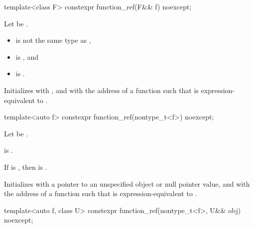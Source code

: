 %
\begin{itemdecl}
template<class F> constexpr function_ref(F&& f) noexcept;
\end{itemdecl}

\begin{itemdescr}
\pnum
Let  be .

\pnum
\constraints
\begin{itemize}
\item {} is not the same type as ,
\item {} is , and
\item {} is .
\end{itemize}

\pnum
\effects
Initializes
 with , and
 with the address of a function 
such that
is expression-equivalent to
.
\end{itemdescr}

%
\begin{itemdecl}
template<auto f> constexpr function_ref(nontype_t<f>) noexcept;
\end{itemdecl}

\begin{itemdescr}
\pnum
Let  be .

\pnum
\constraints
{} is .

\pnum
\mandates
If  is ,
then  is .

\pnum
\effects
Initializes
 with a pointer to an unspecified object or
null pointer value, and
 with the address of a function 
such that
is expression-equivalent to
.
\end{itemdescr}

%
\begin{itemdecl}
template<auto f, class U>
  constexpr function_ref(nontype_t<f>, U&& obj) noexcept;
\end{itemdecl}

